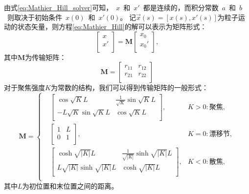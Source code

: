 由式\eqref{eq:Mathier_Hill_solver}可知，~$x$~和~$x'$~都是连续的，而积分常数~$a$~和~$b$~则取决于初始条件~$x(0)$~和~$x'(0)$。
记$\vec{x}(s)=[x(s),x'(s)]$为粒子运动的状态矢量，则方程\eqref{eq:Mathier_Hill}的解可以表示为矩阵形式：
\begin{equation}
    \label{eq:Mathier_Hill_solver_matrix}
    \begin{bmatrix}
      x   \\
      x'  \\
    \end{bmatrix}
    =
    \mathbf{M}
    \begin{bmatrix}
      x_0   \\
      x_0'  \\
    \end{bmatrix}
    ,
\end{equation}
其中$\mathbf{M}$为传输矩阵：
\begin{equation}
    \label{eq:Mathier_Hill_tranfermap}
    \mathbf{M}=
    \begin{bmatrix}
      r_{11} & r_{12}  \\
      r_{21} & r_{22}  \\
    \end{bmatrix}
\end{equation}
对于聚焦强度$K$为常数的结构，我们可以得到传输矩阵的一般形式：
\begin{equation}
    \label{eq:Mathier_Hill_tranfermap_K}
    \mathbf{M}=\left\{
    \begin{aligned}
        &\begin{bmatrix}
          \cos \sqrt{K}L                & \frac{1}{\sqrt{K}} \sin \sqrt{K}L  \\
          -L{\sqrt{K}} \sin \sqrt{K}L    & \cos \sqrt{K}L   \\
        \end{bmatrix}
        ,& K>0:\text{聚焦},  \\
        &\begin{bmatrix}
          1 & L  \\
          0 & 1  \\
        \end{bmatrix}
        ,& K=0:\text{漂移节}, \\
        &\begin{bmatrix}
          \cosh \sqrt{|K|}L                & \frac{1}{\sqrt{|K|}} \sinh \sqrt{|K|}L  \\
          L{\sqrt{|K|}} \sinh \sqrt{|K|}L    & \cosh \sqrt{|K|}L   \\
        \end{bmatrix}
        ,& K<0:\text{散焦}, \\
    \end{aligned}
    \right.
\end{equation}
其中$L$为初位置和末位置之间的距离。

